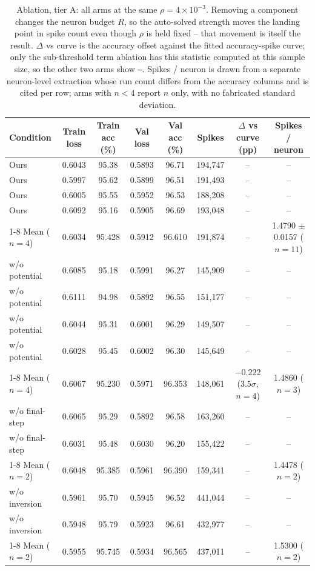 \begin{table}
\centering
\small
\begin{tabular}{lccccccc}
\toprule
Condition & Train loss & Train acc (\%) & Val loss & Val acc (\%) & Spikes & $\Delta$ vs curve (pp) & Spikes / neuron \\
\midrule
Ours & 0.6043 & 95.38 & 0.5893 & 96.71 & 194,747 & -- & -- \\
Ours & 0.5997 & 95.62 & 0.5899 & 96.51 & 191,493 & -- & -- \\
Ours & 0.6005 & 95.55 & 0.5952 & 96.53 & 188,208 & -- & -- \\
Ours & 0.6092 & 95.16 & 0.5905 & 96.69 & 193,048 & -- & -- \\
\cmidrule{1-8}
Mean ($n=4$) & 0.6034 & 95.428 & 0.5912 & 96.610 & 191,874 & -- & 1.4790 $\pm$ 0.0157 ($n{=}11$) \\
\midrule
w/o potential & 0.6085 & 95.18 & 0.5991 & 96.27 & 145,909 & -- & -- \\
w/o potential & 0.6111 & 94.98 & 0.5892 & 96.55 & 151,177 & -- & -- \\
w/o potential & 0.6044 & 95.31 & 0.6001 & 96.29 & 149,507 & -- & -- \\
w/o potential & 0.6028 & 95.45 & 0.6002 & 96.30 & 145,649 & -- & -- \\
\cmidrule{1-8}
Mean ($n=4$) & 0.6067 & 95.230 & 0.5971 & 96.353 & 148,061 & $-0.222$ ($3.5\sigma$, $n{=}4$) & 1.4860 ($n{=}3$) \\
\midrule
w/o final-step & 0.6065 & 95.29 & 0.5892 & 96.58 & 163,260 & -- & -- \\
w/o final-step & 0.6031 & 95.48 & 0.6030 & 96.20 & 155,422 & -- & -- \\
\cmidrule{1-8}
Mean ($n=2$) & 0.6048 & 95.385 & 0.5961 & 96.390 & 159,341 & -- & 1.4478 ($n{=}2$) \\
\midrule
w/o inversion & 0.5961 & 95.70 & 0.5945 & 96.52 & 441,044 & -- & -- \\
w/o inversion & 0.5948 & 95.79 & 0.5923 & 96.61 & 432,977 & -- & -- \\
\cmidrule{1-8}
Mean ($n=2$) & 0.5955 & 95.745 & 0.5934 & 96.565 & 437,011 & -- & 1.5300 ($n{=}2$) \\
\bottomrule
\end{tabular}
\caption{Ablation, tier A: all arms at the same $\rho=4\times10^{-3}$. Removing a component changes the neuron budget $R$, so the auto-solved strength moves the landing point in spike count even though $\rho$ is held fixed -- that movement is itself the result. $\Delta$ vs curve is the accuracy offset against the fitted accuracy-spike curve; only the sub-threshold term ablation has this statistic computed at this sample size, so the other two arms show \texttt{--}. Spikes / neuron is drawn from a separate neuron-level extraction whose run count differs from the accuracy columns and is cited per row; arms with $n<4$ report $n$ only, with no fabricated standard deviation.}
\label{tab:t3_ablation}
\end{table}

